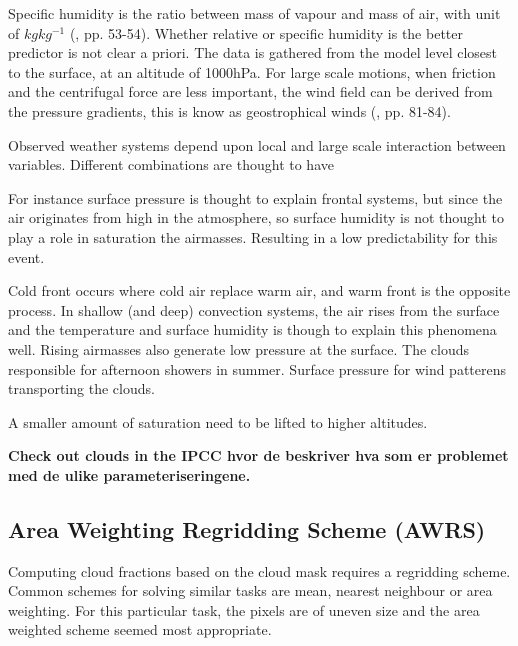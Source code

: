 Specific humidity is the ratio between mass of vapour and mass of air, with unit of $kg kg^{-1}$ (\cite{lohmann2016}, pp. 53-54). Whether relative or specific humidity is the better predictor is not clear a priori. The data is gathered from the model level closest to the surface, at an altitude of 1000hPa. For large scale motions, when friction and the centrifugal force are less important, the wind field can be derived from the pressure gradients, this is know as geostrophical winds  (\cite{lohmann2016}, pp. 81-84).

Observed weather systems depend upon local and large scale interaction between variables. Different combinations are thought to have 

For instance surface pressure is thought to explain frontal systems, but since the air originates from high in the atmosphere, so surface humidity is not thought to play a role in saturation the airmasses. Resulting in a low predictability for this event. 

Cold front occurs where cold air replace warm air, and warm front is the opposite process. In shallow (and deep) convection systems, the air rises from the surface and the temperature and surface humidity is though to explain this phenomena well. Rising airmasses also generate low pressure at the surface. The clouds responsible for afternoon showers in summer. Surface pressure for wind patterens transporting the clouds. 

A smaller amount of saturation need to be lifted to higher altitudes.

\textbf{Check out clouds in the IPCC hvor de beskriver hva som er problemet med de ulike parameteriseringene.}

\subsection{Area Weighting Regridding Scheme (AWRS)} \label{sec:remapping}
Computing cloud fractions based on the cloud mask requires a regridding scheme. Common schemes for solving similar tasks are mean, nearest neighbour or area weighting. For this particular task, the pixels are of uneven size and the area weighted scheme seemed most appropriate. 

